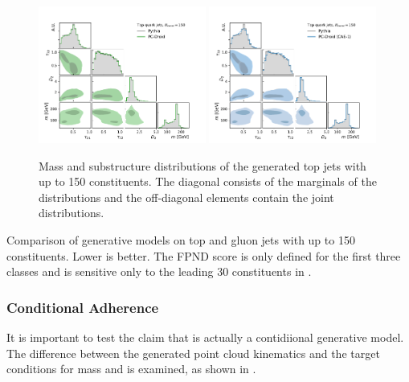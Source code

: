 \begin{figure}[tb]
    \centering
    \includegraphics[width=0.49\textwidth]{Figures/jet_generation/droid/150/hlvs/t/100/hlv_corr_PC-Droid.pdf}
    \includegraphics[width=0.49\textwidth]{Figures/jet_generation/droid/150/hlvs/t/100/hlv_corr_PC-DroidCAE1.pdf}
    \caption{
        Mass and substructure distributions of the generated top jets with up to 150 constituents.
        The diagonal consists of the marginals of the distributions and the off-diagonal elements contain the joint distributions.
    }
    \label{fig:hlvs-150}
\end{figure}

\begin{table}[tb]
    \centering
    \renewcommand{\arraystretch}{1.5}
    \caption{Comparison of generative models on top and gluon jets with up to 150 constituents. Lower is better. The FPND score is only defined for the first three classes and is sensitive only to the leading 30 constituents in \pt.}
    \label{tab:perf-150}
    \resizebox{\textwidth}{!}{%
        
    }
\end{table}

\FloatBarrier

\subsubsection{Conditional Adherence}

It is important to test the claim that \pcdroid is actually a contidiional generative model.
The difference between the generated point cloud kinematics and the target conditions for mass and \pt is examined, as shown in .

